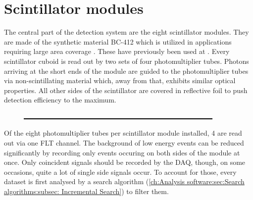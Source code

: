   
  
  \section{Scintillator modules}
  \label{ch:The muon detection system:sec:Scintillator modules}
  The central part of the detection system are the eight scintillator modules. They are made of the synthetic material BC-412 which is utilized in applications requiring large area coverage \cite{scintillatorManual}. These have previously been used at  . Every scintillator cuboid is read out by two sets of four photomultiplier tubes. Photons arriving at the short ends of the module are guided to the photomultiplier tubes via non-scintillating material which, away from that, exhibits similar optical properties. All other sides of the scintillator are covered in reflective foil to push detection efficiency to the maximum.
  \begin{figure}
    \centering
    \includegraphics[width = 0.9\textwidth]{graphics/dummy.eps}	
  \end{figure}
  Of the eight photomultiplier tubes per scintillator module installed, 4 are read out via one FLT channel. The background of low energy events can be reduced significantly by recording only events occuring on both sides of the module at once. Only coincident signals should be recorded by the DAQ, though, on some occasions, quite a lot of single side signals occur. To account for those, every dataset is first analysed by a search algorithm (\ref{ch:Analysis software:sec:Search algorithms:subsec: Incremental Search}) to filter them.
  

  
  
